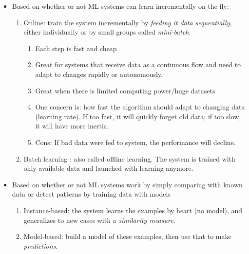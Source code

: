 \documentclass[12pt,oneside,a4paper]{article}
\numberwithin{equation}{section}
\begin{document}
\begin{itemize}
\item Based on whether or not ML systems can learn incrementally on the fly:
\begin{enumerate}
\item Online: train the system incrementally by \emph{feeding it data sequentially}, either individually or by small groups called \emph{mini-batch}. 
\begin{enumerate}
\item Each step is fast and cheap
\item Great for systems that receive data as a continuous flow and need to adapt to changes rapidly or autonomously. 
\item Great when there is limited computing power/huge datasets
\item One concern is: how fast the algorithm should adapt to changing data (learning rate). If too fast, it will quickly forget old data; if too slow, it will have more inertia.
\item Cons: If bad data were fed to system, the performance will decline.  
\end{enumerate} 
\item Batch learning : also called offline learning. The system is trained with only available data and launched with learning anymore. 
\end{enumerate}

\item Based on whether or not ML systems work by simply comparing with known data or detect patterns by training data with models 
\begin{enumerate}
\item Instance-based: the system learns the examples by heart (no model), and generalizes to new cases with a \emph{similarity measure}. 
\item Model-based: build a model of these examples, then use that to make \emph{predictions}. 
\end{enumerate}
\end{itemize}
\end{document}
